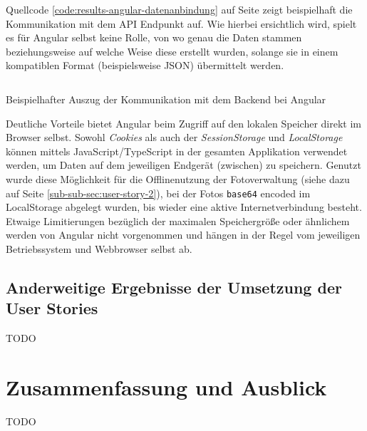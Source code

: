 \documentclass[a4paper,12pt,twoside]{scrreprt}
\begin{document}
Quellcode \ref{code:results-angular-datenanbindung} auf Seite \pageref{code:results-angular-datenanbindung} zeigt beispielhaft die Kommunikation mit dem  API Endpunkt auf. Wie hierbei ersichtlich wird, spielt es für Angular selbst keine Rolle, von wo genau die Daten stammen beziehungsweise auf welche Weise diese erstellt wurden, solange sie in einem kompatiblen Format (beispielsweise \acs{JSON}) übermittelt werden.

\begin{listing}[ht]
    \renewcommand{\fcolorbox}[4][]{#4}
    \inputminted[fontsize=\footnotesize,linenos,breaklines]{js}{code/Luidold_Results-Angular-Datenanbindung-CodeSample.ts}
    \caption[Beispielhafter Auszug der Kommunikation mit dem Backend bei Angular]{Beispielhafter Auszug der Kommunikation mit dem Backend bei Angular}
    \label{code:results-angular-datenanbindung}
\end{listing}

Deutliche Vorteile bietet Angular beim Zugriff auf den lokalen Speicher direkt im Browser selbst. Sowohl \textit{Cookies} als auch der \textit{SessionStorage} und \textit{LocalStorage} können mittels JavaScript/TypeScript in der gesamten Applikation verwendet werden, um Daten auf dem jeweiligen Endgerät (zwischen) zu speichern. Genutzt wurde diese Möglichkeit für die Offlinenutzung der Fotoverwaltung (siehe dazu \textit{} auf Seite \ref{sub-sub-sec:user-story-2}), bei der Fotos \texttt{base64} encoded im LocalStorage abgelegt wurden, bis wieder eine aktive Internetverbindung besteht. Etwaige Limitierungen bezüglich der maximalen Speichergröße oder ähnlichem werden von Angular nicht vorgenommen und hängen in der Regel vom jeweiligen Betriebssystem und Webbrowser selbst ab.

\section{Anderweitige Ergebnisse der Umsetzung der User Stories}
\label{sec:results-user-stories}
TODO

\chapter{Zusammenfassung und Ausblick}
\label{chap:zusammenfassung-ausblick}
TODO

\clearpage
{}
{}
\printbibliography

\appendix
\end{document}
